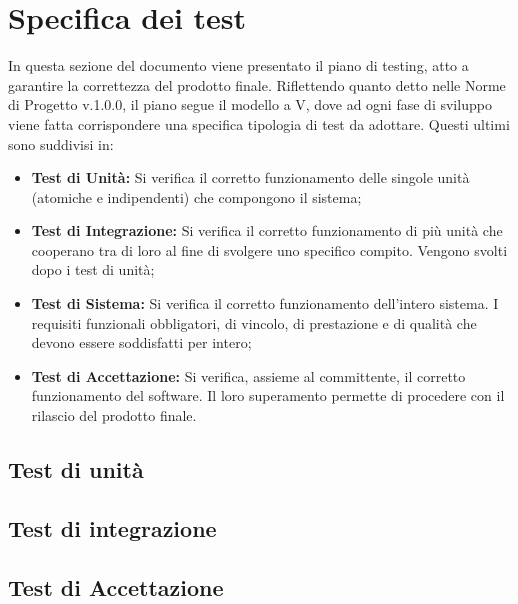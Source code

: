 \section{Specifica dei test}

In questa sezione del documento viene presentato il piano di testing, atto a garantire la correttezza del prodotto finale. Riflettendo quanto detto nelle Norme di Progetto v.1.0.0, il piano segue il modello a V, dove ad ogni fase di sviluppo viene fatta corrispondere una specifica tipologia di test da adottare. Questi ultimi sono suddivisi in:

\begin{itemize}
    \item \textbf{Test di Unità:} Si verifica il corretto funzionamento delle singole unità (atomiche e indipendenti) che compongono il sistema;
    \item \textbf{Test di Integrazione:} Si verifica il corretto funzionamento di più unità che cooperano tra di loro al fine di svolgere uno specifico compito. Vengono svolti dopo i test di unità;
    \item \textbf{Test di Sistema:} Si verifica il corretto funzionamento dell'intero sistema. I requisiti funzionali obbligatori, di vincolo, di prestazione e di qualità che devono essere soddisfatti per intero;
    \item \textbf{Test di Accettazione:} Si verifica, assieme al committente, il corretto funzionamento del software. Il loro superamento permette di procedere con il rilascio del prodotto finale.
\end{itemize}

\subsection{Test di unità}


\subsection{Test di integrazione}




\subsection{Test di Accettazione}
